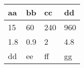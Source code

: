 \begin{table}[htbp]
\centering
\label{kindness}
\begin{tabular}{|l|l|l|l|}
\hline
aa  & bb  & cc  & dd    \\ \hline
15  & 60  & 240 & 960   \\ \hline
1.8 & 0.9 & 2   & 4.8   \\ \hline
dd  & ee  & ff  & gg    \\ \hline
\end{tabular}
\end{table}